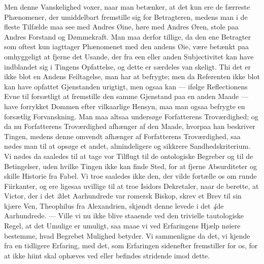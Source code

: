 \documentclass[12pt]{book}
\newcommand{\opage}[1]{\marginnote{\footnotesize\textit{[#1]}}}
\begin{document}
Men denne Vanskelighed voxer, naar man betænker, at det kun ere de færreste
Phænomener, der umiddelbart fremstille sig for Betragteren, medens man i de
fleste Tilfælde maa see med Andres Øine, høre med Andres Øren, stole paa Andres
Forstand og Dømmekraft. Man maa derfor tillige, da den ene Betragter som oftest
kun iagttager Phænomenet med den andens Øie, være betænkt paa omhyggeligt at
fjerne det Usande, der fra een eller anden Subjectivitet kan have indblandet sig
i Tingens Opfattelse, og dette er særdeles van%
\opage{14}skeligt. Thi det er ikke blot en Andens Feiltagelse, man har at befrygte; men da
Referenten ikke blot kan have opfattet Gjenstanden urigtigt, men ogsaa kan ---
ifølge Reflectionens Evne til forsætligt at fremstille den samme Gjenstand paa
en anden Maade --- have forrykket Dommen efter vilkaarlige Hensyn, maa man ogsaa
befrygte en forsætlig Forvanskning. Man maa altsaa undersøge Forfatterens
Troværdighed; og da nu Forfatterens Troværdighed afhænger af den Maade, hvorpaa
han beskriver Tingen, medens denne omvendt afhænger af Forfatterens
Troværdighed, saa nødes man til at opsøge et andet, almindeligere og sikkrere
Sandhedskriterium. Vi nødes da saaledes til at tage vor Tilflugt til de
ontologiske Begreber og til de Betingelser, uden hvilke Tingen ikke kan finde
Sted, for at fjerne Absurditeter og skille Historie fra Fabel. Vi troe saaledes
ikke den, der vilde fortælle os om runde Fiirkanter, og ere ligesaa uvillige til
at troe Isidors Dekretaler, naar de berette, at Victor, der i det
\textit{2}det Aarhundrede var romersk Biskop, skrev et Brev til sin kjære Ven,
Theophilus fra Alexandrien, skjøndt denne levede i det \textit{4}de
Aarhundrede. --- Ville vi nu ikke blive staaende ved den trivielle tautologiske
Regel, at det Umulige er umuligt, saa maae vi ved Erfaringens Hjælp nøiere
bestemme, hvad Begrebet Mulighed betyder. Vi sammenligne da det, vi kjende fra
en tidligere Erfaring, med det, som Erfaringen sidenefter fremstiller for os,
for at ikke hiint skal ophæves ved eller befindes stridende imod dette.
\end{document}
